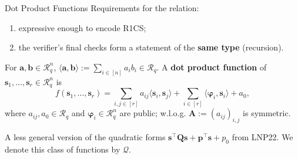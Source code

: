 \documentclass{zkdl-presentation-template}
\begin{document}
    \begin{frame}{Dot Product Functions}
        Requirements for the relation:
        \begin{enumerate}
            \item expressive enough to encode R1CS;
            \item the verifier's final checks form a statement of the \textbf{same type} (recursion).
        \end{enumerate}
        \pause

        For $\mathbf{a}, \mathbf{b} \in \mathcal{R}_q^n$, $\langle \mathbf{a}, \mathbf{b} \rangle := \sum_{i \in [n]} a_ib_i \in \mathcal{R}_q$. A \textbf{dot product function} of $\mathbf{s}_1, \dots, \mathbf{s}_r \in \mathcal{R}_q^n$ is
        \begin{equation*}
            f(\mathbf{s}_1, \dots, \mathbf{s}_r) = \sum_{i,j \in [r]} a_{ij}\langle \mathbf{s}_i, \mathbf{s}_j \rangle + \sum_{i \in [r]} \langle \boldsymbol{\varphi}_i, \mathbf{s}_i \rangle + a_0,
        \end{equation*}
        where $a_{ij}, a_0 \in \mathcal{R}_q$ and $\boldsymbol{\varphi}_i \in \mathcal{R}_q^n$ are public; w.l.o.g. $\mathbf{A} := (a_{ij})_{i,j}$ is symmetric.
        \pause

        \begin{remark}
            A less general version of the quadratic forms $\mathbf{s}^{\top}\mathbf{Q}\mathbf{s} + \mathbf{p}^{\top}\mathbf{s} + p_0$ from LNP22. We denote this class of functions by $\mathcal{Q}$.
        \end{remark}
    \end{frame}
\end{document}
